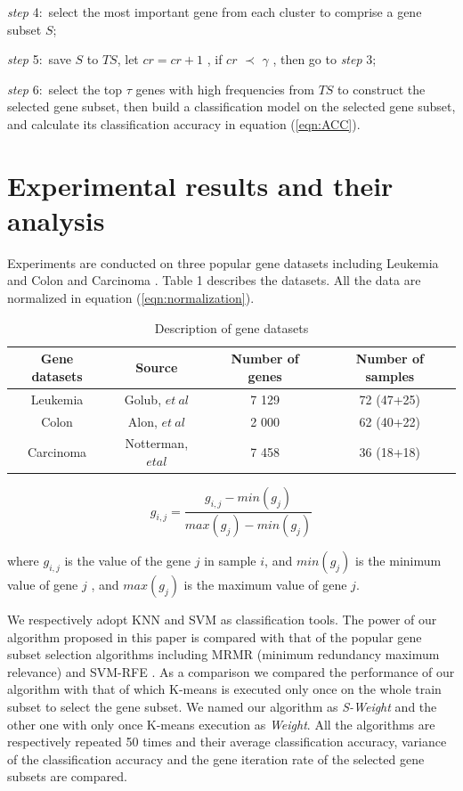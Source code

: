 \documentclass[runningheads,a4paper]{llncs}
\begin{document}
\emph{step} 4:~select the most important gene from each cluster to comprise a gene subset $S$;

\emph{step} 5:~save $S$ to $TS$, let $cr = cr + 1$ , if $cr$ $\prec$ $\gamma$ , then go to \emph{step} 3;

\emph{step} 6:~select the top $\tau$  genes with high frequencies from $TS$ to construct the selected gene subset, then build a classification model on the selected gene subset, and calculate its classification accuracy in equation (\ref{eqn:ACC}). 


\section{Experimental results and their analysis}
Experiments are conducted on three popular gene datasets including Leukemia \cite{golub1999molecular} and Colon \cite{alon1999broad} and Carcinoma \cite{notterman2001transcriptional}. Table 1 describes the datasets. All the data are normalized in equation (\ref{eqn:normalization}).

\begin{table}\label{tab:data}
\centering
\caption{Description of gene datasets}
\begin{tabular}{cccc}
\hline
Gene datasets & Source	&  Number of genes &	Number of samples\\
\hline
Leukemia & Golub, $et~al$ \cite{golub1999molecular}	&7 129&	72 (47+25)\\
Colon&	Alon, $et~al$ \cite{alon1999broad}&	2 000&	62 (40+22)\\
Carcinoma&	Notterman, $et al$ \cite{notterman2001transcriptional}	&   7 458&	36 (18+18)\\
\hline
\end{tabular}
\end{table}

\begin{equation}\label{eqn:normalization}
g_{i,j} = \frac{ g_{i,j}-min(g_j)}{max(g_j)-min(g_j)}
\end{equation}

where $g_{i,j}$  is the value of the gene $j$  in sample $i$, and $min(g_j)$  is the minimum value of gene $j$ , and $max(g_j)$  is the maximum value of gene $j$.

We respectively adopt KNN \cite{cover1967nearest} and SVM \cite{vapnik2000nature} as classification tools. The power of our algorithm proposed in this paper is compared with that of the popular gene subset selection algorithms including  MRMR (minimum redundancy maximum relevance) \cite{ding2005minimum} and SVM-RFE \cite{guyon2002gene}. As a comparison we compared the performance of our algorithm with that of which K-means is executed only once on the whole train subset to select the gene subset. We named our algorithm as \emph{S-Weight} and the other one with only once K-means execution as \emph{Weight}. All the algorithms are respectively repeated 50 times and their average classification accuracy, variance of the classification accuracy and the gene iteration rate \cite{ding2005minimum} of the selected gene subsets are compared. 
\end{document}
